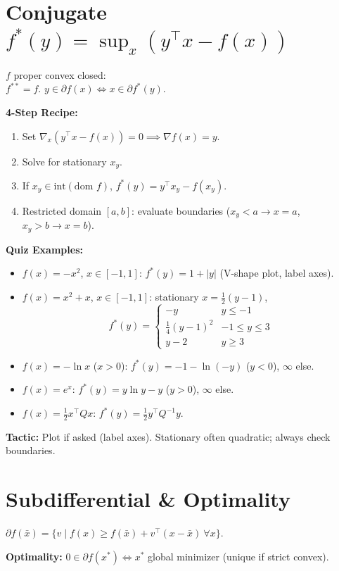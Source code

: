 \section*{Conjugate \(f^*(y)=\sup_x(y^\top x-f(x))\)}
\(f\) proper convex closed: \\
\( f^{**}=f\). \(y\in\partial
f(x)\iff x\in\partial f^*(y)\).

\textbf{4-Step Recipe:}
\begin{enumerate}[leftmargin=*,itemsep=-1pt]
  \item Set \(\nabla_x(y^\top x - f(x))=0\implies\nabla f(x)=y\).
  \item Solve for stationary \(x_y\).
  \item If \(x_y\in\text{int}(\text{dom }f)\), \(f^*(y)=y^\top x_y - f(x_y)\).
  \item Restricted domain \([a,b]\): evaluate boundaries (\(x_y<a\to
    x=a\), \(x_y>b\to x=b\)).
\end{enumerate}

\textbf{Quiz Examples:}
\begin{itemize}[leftmargin=*,itemsep=-1pt]
  \item \(f(x)=-x^2\), \(x\in[-1,1]\): \(f^*(y)=1+|y|\) (V-shape
    plot, label axes).
  \item \(f(x)=x^2+x\), \(x\in[-1,1]\): stationary \(x=\frac12(y-1)\),
    \[
      f^*(y)=
      \begin{cases}
        -y & y\le-1\\
        \frac14(y-1)^2 & -1\le y\le3\\
        y-2 & y\ge3
      \end{cases}
    \]
  \item \(f(x)=-\ln x\) (\(x>0\)): \(f^*(y)=-1-\ln(-y)\) (\(y<0\)),
    \(\infty\) else.
  \item \(f(x)=e^x\): \(f^*(y)=y\ln y-y\) (\(y>0\)), \(\infty\) else.
  \item \(f(x)=\frac12 x^\top Qx\): \(f^*(y)=\frac12 y^\top Q^{-1}y\).
\end{itemize}
\textbf{Tactic:} Plot if asked (label axes). Stationary often
quadratic; always check boundaries.

\section*{Subdifferential \& Optimality}
\(\partial f(\bar x)=\{v\mid f(x)\ge f(\bar x)+v^\top(x-\bar x)\ \forall x\}\).

\textbf{Optimality:} \(0\in\partial f(x^*)\iff x^*\) global minimizer
(unique if strict convex).


